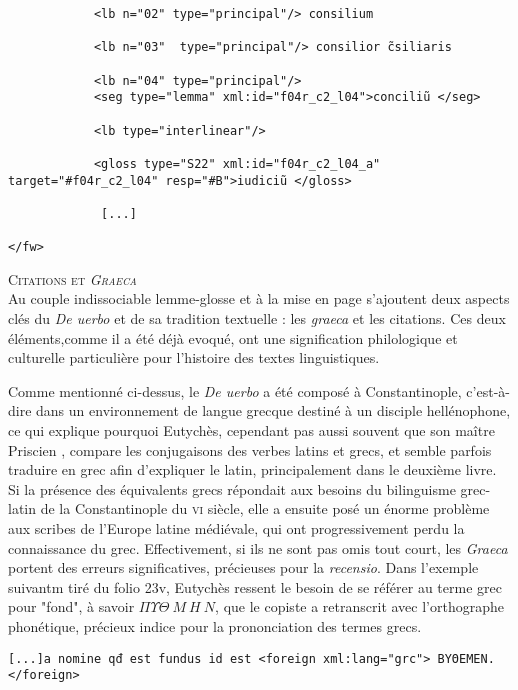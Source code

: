 \documentclass[a4paper, twoside, 12pt]{book}
\begin{document}
\begin{verbatim}
            <lb n="02" type="principal"/> consilium 
                                    
            <lb n="03"  type="principal"/> consilior c̃siliaris
                                    
            <lb n="04" type="principal"/>
            <seg type="lemma" xml:id="f04r_c2_l04">conciliũ </seg>
                              
            <lb type="interlinear"/>
            
            <gloss type="S22" xml:id="f04r_c2_l04_a" target="#f04r_c2_l04" resp="#B">iudiciũ </gloss> 
            
             [...]
            
</fw>

\end{verbatim}

\textsc{Citations et \textit{Graeca}}\\

Au couple indissociable lemme-glosse et à la mise en page s'ajoutent deux aspects clés du \textit{De uerbo} et de sa tradition textuelle : les \textit{graeca} et les citations. Ces deux éléments,comme il a été déjà evoqué, ont une signification philologique et culturelle particulière pour l'histoire des textes linguistiques. 

Comme mentionné ci-dessus, le \textit{De uerbo} a été composé à Constantinople, c'est-à-dire dans un environnement de langue grecque destiné à un disciple hellénophone, ce qui explique pourquoi Eutychès, cependant pas aussi souvent que son maître Priscien , compare les conjugaisons des verbes latins et grecs, et semble parfois traduire en grec afin d'expliquer le latin, principalement dans le deuxième livre. Si la présence des équivalents grecs répondait aux besoins du bilinguisme grec-latin de la Constantinople du \textsc{vi}\ieme{} siècle, elle a ensuite posé un énorme problème aux scribes de l'Europe latine médiévale, qui ont progressivement perdu la connaissance du grec. Effectivement, si ils ne sont pas omis tout court, les \textit{Graeca} portent des erreurs significatives, précieuses pour la \textit{recensio}. Dans l'exemple suivantm tiré du folio 23v, Eutychès ressent le besoin de se référer au terme grec pour "fond", à savoir $\Pi \Upsilon \Theta \ M\ H\ N$, que le copiste a retranscrit avec l'orthographe phonétique, précieux indice pour la prononciation des termes grecs. \\ 

\begin{verbatim}
[...]a nomine qđ est fundus id est <foreign xml:lang="grc"> ΒΥΘΕΜΕΝ.</foreign>
\end{verbatim}
\end{document}
